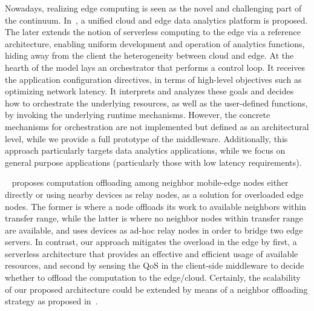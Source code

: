 Nowadays, realizing edge computing is seen as the novel and challenging part of the continuum. In~\cite{Nastic17ServerlessDataAnalytics}, a unified cloud and edge data analytics platform is proposed. The later extends the notion of serverless computing to the edge via a reference architecture, enabling uniform development and operation of analytics functions, hiding away from the client the heterogeneity between cloud and edge. At the hearth of the model lays an orchestrator that performs a control loop. It receives
the application configuration directives, in terms of high-level objectives
such as optimizing network latency. It interprets and analyzes these goals
and decides how to orchestrate the
underlying resources, as well as the
user-defined functions, by invoking
the underlying runtime mechanisms. However, the concrete mechanisms for orchestration are not implemented but defined as an architectural level, while we provide a full prototype of the middleware. Additionally, this approach particularly targets data analytics applications, while we focus on general purpose applications (particularly those with low latency requirements).



~\cite{Satria2017mec} proposes computation offloading among neighbor mobile-edge nodes either directly or using nearby devices as relay nodes, as a solution for overloaded edge nodes. The former is where a node offloads its work to available neighbors within transfer range, while the latter is where no neighbor nodes within transfer range are available, and uses devices as ad-hoc relay nodes in order to bridge two edge servers. In contrast, our approach mitigates the overload in the edge by first, a serverless architecture that provides an effective and efficient usage of available resources, and second by sensing the QoS in the client-side middleware to decide whether to offload the computation to the edge/cloud. Certainly, the scalability of our proposed architecture could be extended by means of a neighbor offloading strategy as proposed in~\cite{Satria2017mec}.

